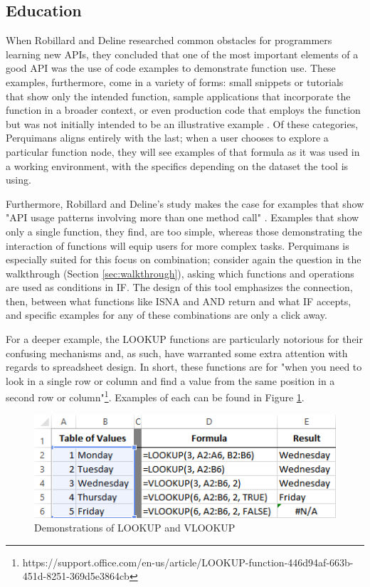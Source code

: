 \documentclass[conference]{IEEEtran}
\newcommand{\toolname}{Perquimans }
\begin{document}
	\subsection{Education} When Robillard and Deline researched common obstacles
	for programmers learning new APIs, they concluded that one of the most
	important elements of a good API was the use of code examples to demonstrate
	function use. These examples, furthermore, come in a variety of forms: small
	snippets or tutorials that show only the intended function, sample applications
	that incorporate the function in a broader context, or even production code
	that employs the function but was not initially intended to be an illustrative
	example \cite{robillard2011field}. Of these categories, \toolname aligns
	entirely with the last; when a user chooses to explore a particular function
	node, they will see examples of that formula as it was used in a working
	environment, with the specifics depending on the dataset the tool is using.
	\par
	
	Furthermore, Robillard and Deline's study makes the case for examples that show
	"API usage patterns involving more than one method call"
	\cite{robillard2011field}. Examples that show only a single function, they
	find, are too simple, whereas those demonstrating the interaction of functions
	will equip users for more complex tasks. \toolname is especially suited for
	this focus on combination; consider again the question in the walkthrough
	(Section \ref{sec:walkthrough}), asking which functions and operations are used
	as conditions in IF. The design of this tool emphasizes the connection, then,
	between what functions like ISNA and AND return and what IF accepts, and
	specific examples for any of these combinations are only a click away.
	
	For a deeper example, the LOOKUP functions are particularly notorious for their
	confusing mechanisms and, as such, have warranted some extra attention with
	regards to spreadsheet design. In short, these functions are for "when you need
	to look in a single row or column and find a value from the same position in a
	second row or
	column"\footnote{https://support.office.com/en-us/article/LOOKUP-function-446d94af-663b-451d-8251-369d5e3864cb}. Examples of each can be found in Figure \ref{fig:lookupexample}.
	
	\begin{figure} \centering \includegraphics[width=.5\textwidth]{lookupexample}
		 \caption{Demonstrations of LOOKUP and VLOOKUP} \label{fig:lookupexample}
	\end{figure}
	
\end{document}
